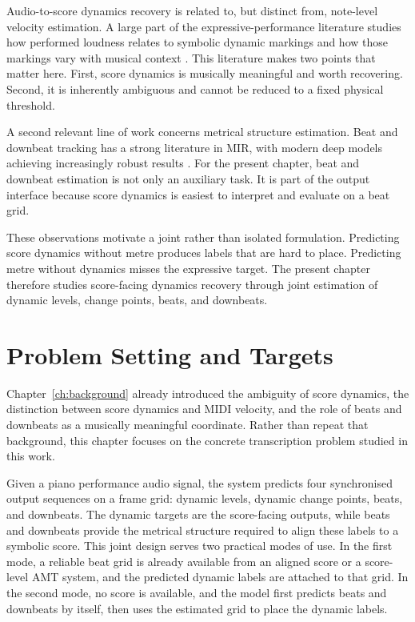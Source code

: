 Audio-to-score dynamics recovery is related to, but distinct from, note-level velocity estimation. A large part of the expressive-performance literature studies how performed loudness relates to symbolic dynamic markings and how those markings vary with musical context \cite{kosta2014dynpiano,kosta2016mapping,jones2023probingdyn}. This literature makes two points that matter here. First, score dynamics is musically meaningful and worth recovering. Second, it is inherently ambiguous and cannot be reduced to a fixed physical threshold.

A second relevant line of work concerns metrical structure estimation. Beat and downbeat tracking has a strong literature in MIR, with modern deep models achieving increasingly robust results \cite{bock2020deconstruct,zhao2022beat,foscarin2024beat}. For the present chapter, beat and downbeat estimation is not only an auxiliary task. It is part of the output interface because score dynamics is easiest to interpret and evaluate on a beat grid.

These observations motivate a joint rather than isolated formulation. Predicting score dynamics without metre produces labels that are hard to place. Predicting metre without dynamics misses the expressive target. The present chapter therefore studies score-facing dynamics recovery through joint estimation of dynamic levels, change points, beats, and downbeats.

\section{Problem Setting and Targets}
\label{sec:audiodyn_targets}

Chapter~\ref{ch:background} already introduced the ambiguity of score dynamics, the distinction between score dynamics and MIDI velocity, and the role of beats and downbeats as a musically meaningful coordinate. Rather than repeat that background, this chapter focuses on the concrete transcription problem studied in this work.

Given a piano performance audio signal, the system predicts four synchronised output sequences on a frame grid: dynamic levels, dynamic change points, beats, and downbeats. The dynamic targets are the score-facing outputs, while beats and downbeats provide the metrical structure required to align these labels to a symbolic score. This joint design serves two practical modes of use. In the first mode, a reliable beat grid is already available from an aligned score or a score-level AMT system, and the predicted dynamic labels are attached to that grid. In the second mode, no score is available, and the model first predicts beats and downbeats by itself, then uses the estimated grid to place the dynamic labels.

